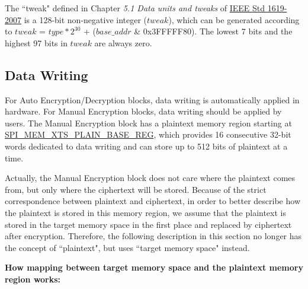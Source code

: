 \documentclass[main\_\_EN.tex]{subfiles}
\begin{document}
\begin{tiplisting}
\vspace{-2em}
\begin{enumerate}
    The ``tweak" defined in Chapter \textit{5.1 Data units and tweaks} of \href{https://ieeexplore.ieee.org/document/4493450}{IEEE Std 1619-2007} is a 128-bit non-negative integer (\begin{math} tweak \end{math}), which can be generated according to \begin{math} tweak \end{math} = \begin{math} type * 2^{30}\end{math} + (\begin{math} base\_addr \end{math} \& 0x3FFFFF80). The lowest 7 bits and the highest 97 bits in \begin{math} tweak \end{math} are always zero.
\end{enumerate}
\end{tiplisting}

\subsection{Data Writing}
\label{sec:extmemncr-data-writing}

For Auto Encryption/Decryption blocks, data writing is automatically applied in hardware. For Manual Encryption blocks, data writing should be applied by users. The Manual Encryption block has a plaintext memory region starting at \hyperref[regdesc:SPIMEMXTSPLAINBASEREG]{SPI\_MEM\_XTS\_PLAIN\_BASE\_REG}, which provides 16 consecutive 32-bit words dedicated to data writing and can store up to 512 bits of plaintext at a time.

Actually, the Manual Encryption block does not care where the plaintext comes from, but only where the ciphertext will be stored. Because of the strict correspondence between plaintext and ciphertext, in order to better describe how the plaintext is stored in this memory region, we assume that the plaintext is stored in the target memory space in the first place and replaced by ciphertext after encryption. Therefore, the following description in this section no longer has the concept of ``plaintext", but uses ``target memory space" instead.

{\bfseries How mapping between target memory space and the plaintext memory region works:}
\end{document}
